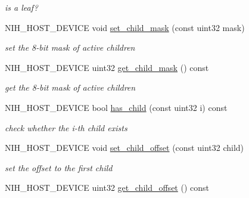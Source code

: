 \begin{DoxyCompactItemize}
\begin{DoxyCompactList}\small\item\em is a leaf? \end{DoxyCompactList}\item 
\hypertarget{structnih_1_1_octree__node_ab69e1a993781d79bf7cc8fb83d52d47d}{
\-N\-I\-H\-\_\-\-H\-O\-S\-T\-\_\-\-D\-E\-V\-I\-C\-E void \hyperlink{structnih_1_1_octree__node_ab69e1a993781d79bf7cc8fb83d52d47d}{set\-\_\-child\-\_\-mask} (const uint32 mask)}
\label{structnih_1_1_octree__node_ab69e1a993781d79bf7cc8fb83d52d47d}

\begin{DoxyCompactList}\small\item\em set the 8-\/bit mask of active children \end{DoxyCompactList}\item 
\hypertarget{structnih_1_1_octree__node_adaa2c13b9e0ffc867fc3d29c51cf2c8c}{
\-N\-I\-H\-\_\-\-H\-O\-S\-T\-\_\-\-D\-E\-V\-I\-C\-E uint32 \hyperlink{structnih_1_1_octree__node_adaa2c13b9e0ffc867fc3d29c51cf2c8c}{get\-\_\-child\-\_\-mask} () const }
\label{structnih_1_1_octree__node_adaa2c13b9e0ffc867fc3d29c51cf2c8c}

\begin{DoxyCompactList}\small\item\em get the 8-\/bit mask of active children \end{DoxyCompactList}\item 
\hypertarget{structnih_1_1_octree__node_aaeea10ec3cc2c68d7ae4f152e5846385}{
\-N\-I\-H\-\_\-\-H\-O\-S\-T\-\_\-\-D\-E\-V\-I\-C\-E bool \hyperlink{structnih_1_1_octree__node_aaeea10ec3cc2c68d7ae4f152e5846385}{has\-\_\-child} (const uint32 i) const }
\label{structnih_1_1_octree__node_aaeea10ec3cc2c68d7ae4f152e5846385}

\begin{DoxyCompactList}\small\item\em check whether the i-\/th child exists \end{DoxyCompactList}\item 
\hypertarget{structnih_1_1_octree__node_aad609d0cf52db7d27659e4c774e8fca6}{
\-N\-I\-H\-\_\-\-H\-O\-S\-T\-\_\-\-D\-E\-V\-I\-C\-E void \hyperlink{structnih_1_1_octree__node_aad609d0cf52db7d27659e4c774e8fca6}{set\-\_\-child\-\_\-offset} (const uint32 child)}
\label{structnih_1_1_octree__node_aad609d0cf52db7d27659e4c774e8fca6}

\begin{DoxyCompactList}\small\item\em set the offset to the first child \end{DoxyCompactList}\item 
\hypertarget{structnih_1_1_octree__node_aa3810224603c4ed2b1a3ea781bb8c802}{
\-N\-I\-H\-\_\-\-H\-O\-S\-T\-\_\-\-D\-E\-V\-I\-C\-E uint32 \hyperlink{structnih_1_1_octree__node_aa3810224603c4ed2b1a3ea781bb8c802}{get\-\_\-child\-\_\-offset} () const }
\label{structnih_1_1_octree__node_aa3810224603c4ed2b1a3ea781bb8c802}


\end{DoxyCompactItemize}
